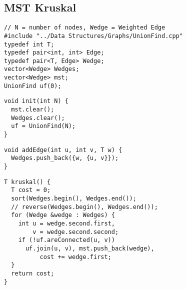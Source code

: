\documentclass[twoside]{article}
\begin{document}
\begin{multicols*}{2}
\subsection*{MST Kruskal}
\begin{verbatim}
// N = number of nodes, Wedge = Weighted Edge
#include "../Data Structures/Graphs/UnionFind.cpp"
typedef int T;
typedef pair<int, int> Edge;
typedef pair<T, Edge> Wedge;
vector<Wedge> Wedges;
vector<Wedge> mst;
UnionFind uf(0);
\end{verbatim}
\vspace{-12pt}
\begin{verbatim}
void init(int N) {
  mst.clear();
  Wedges.clear();
  uf = UnionFind(N);
}
\end{verbatim}
\vspace{-12pt}
\begin{verbatim}
void addEdge(int u, int v, T w) {
  Wedges.push_back({w, {u, v}});
}
\end{verbatim}
\vspace{-12pt}
\begin{verbatim}
T kruskal() {
  T cost = 0;
  sort(Wedges.begin(), Wedges.end());
  // reverse(Wedges.begin(), Wedges.end());
  for (Wedge &wedge : Wedges) {
    int u = wedge.second.first,
        v = wedge.second.second;
    if (!uf.areConnected(u, v))
      uf.join(u, v), mst.push_back(wedge),
          cost += wedge.first;
  }
  return cost;
}
\end{verbatim}

\subsectionfont{\large\bfseries\sffamily\underline}

\end{multicols*}
\end{document}
